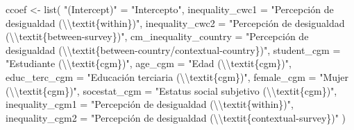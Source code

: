 \documentclass[
  12pt,
  a4paper,
]{article}
\newenvironment{Shaded}{\begin{snugshade}}{\end{snugshade}}
\newcommand{\AttributeTok}[1]{\textcolor[rgb]{0.77,0.63,0.00}{#1}}
\newcommand{\FunctionTok}[1]{\textcolor[rgb]{0.00,0.00,0.00}{#1}}
\newcommand{\NormalTok}[1]{#1}
\newcommand{\OtherTok}[1]{\textcolor[rgb]{0.56,0.35,0.01}{#1}}
\newcommand{\SpecialCharTok}[1]{\textcolor[rgb]{0.00,0.00,0.00}{#1}}
\newcommand{\StringTok}[1]{\textcolor[rgb]{0.31,0.60,0.02}{#1}}
\begin{document}
\begin{Shaded}
\begin{Highlighting}[]
\NormalTok{ccoef }\OtherTok{\textless{}{-}} \FunctionTok{list}\NormalTok{(}
  \StringTok{"(Intercept)"} \OtherTok{=} \StringTok{"Intercepto"}\NormalTok{,}
  \AttributeTok{inequality\_cwc1  =} \StringTok{"Percepción de desigualdad (}\SpecialCharTok{\textbackslash{}\textbackslash{}}\StringTok{textit\{within\})"}\NormalTok{,}
  \AttributeTok{inequality\_cwc2 =} \StringTok{"Percepción de desigualdad (}\SpecialCharTok{\textbackslash{}\textbackslash{}}\StringTok{textit\{between{-}survey\})"}\NormalTok{,}
  \AttributeTok{cm\_inequality\_country =} \StringTok{"Percepción de desigualdad (}\SpecialCharTok{\textbackslash{}\textbackslash{}}\StringTok{textit\{between{-}country/contextual{-}country\})"}\NormalTok{,}
  \AttributeTok{student\_cgm =} \StringTok{"Estudiante (}\SpecialCharTok{\textbackslash{}\textbackslash{}}\StringTok{textit\{cgm\})"}\NormalTok{,}
  \AttributeTok{age\_cgm =} \StringTok{"Edad (}\SpecialCharTok{\textbackslash{}\textbackslash{}}\StringTok{textit\{cgm\})"}\NormalTok{,}
  \AttributeTok{educ\_terc\_cgm =} \StringTok{"Educación terciaria (}\SpecialCharTok{\textbackslash{}\textbackslash{}}\StringTok{textit\{cgm\})"}\NormalTok{,}
  \AttributeTok{female\_cgm =} \StringTok{"Mujer (}\SpecialCharTok{\textbackslash{}\textbackslash{}}\StringTok{textit\{cgm\})"}\NormalTok{,}
  \AttributeTok{socestat\_cgm =} \StringTok{"Estatus social subjetivo (}\SpecialCharTok{\textbackslash{}\textbackslash{}}\StringTok{textit\{cgm\})"}\NormalTok{,}
  \AttributeTok{inequality\_cgm1 =} \StringTok{"Percepción de desigualdad (}\SpecialCharTok{\textbackslash{}\textbackslash{}}\StringTok{textit\{within\})"}\NormalTok{,}
  \AttributeTok{inequality\_cgm2 =} \StringTok{"Percepción de desigualdad (}\SpecialCharTok{\textbackslash{}\textbackslash{}}\StringTok{textit\{contextual{-}survey\})"}
\NormalTok{ )}


\end{Highlighting}
\end{Shaded}
\end{document}
